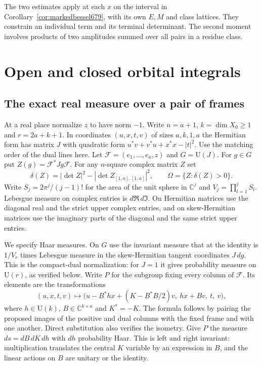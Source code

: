 \documentclass[a4paper,11pt]{article}
\theoremstyle{definition}
\theoremstyle{remark}
\numberwithin{equation}{section}
\begin{document}
The two estimates apply at each \(x\) on the interval in
Corollary~\ref{cor:markedbessel679}, with its own \(E,M\) and
class lattices. They constrain an individual term and its
terminal determinant. The second moment involves products of
two amplitudes summed over all pairs in a residue class.

\section{Open and closed orbital integrals}\label{nav:marked-open-closed}

\subsection{The exact real measure over a pair of frames}
\label{sec:realgram682}

At a real place normalize \(z\) to have norm \(-1\).
Write \(n=a+1\), \(k=\dim X_0\ge1\) and \(r=2a+k+1\).
In coordinates \((u,x,t,v)\) of sizes \(a,k,1,a\) the Hermitian
form has matrix \(J\) with quadratic form
\(u^*v+v^*u+x^*x-|t|^2\). Use the matching order of the dual
lines here. Let \(\mathcal F=(e_1,\ldots,e_a,z)\) and \(G=\mathrm U(J)\).
For \(g\in G\) put \(Z(g)=\mathcal F^*Jg\mathcal F\). For any
\(n\)-square complex matrix \(Z\) set
\[
 \delta(Z)=|\det Z|^2-|\det Z_{[1,a],[1,a]}|^2,\qquad
 \Omega=\{Z:\delta(Z)>0\}.
\]
Write \(S_j=2\pi^j/(j-1)!\) for the area of the unit sphere in
\(\mathbb C^j\) and \(V_j=\prod_{l=1}^j S_l\).
Lebesgue measure on complex entries is \(d\Re\,d\Im\). On
Hermitian matrices use the diagonal real and the strict upper
complex entries, and on skew-Hermitian matrices use the imaginary
parts of the diagonal and the same strict upper entries.

We specify Haar measures. On \(G\) use the invariant measure
that at the identity is \(1/V_r\) times Lebesgue measure in the
skew-Hermitian tangent coordinates \(J\,dg\). This is the
compact-dual normalization: for \(J=1\) it gives probability
measure on \(\mathrm U(r)\), as verified below. Write \(P\)
for the subgroup fixing every column of \(\mathcal F\). Its
elements are the transformations
\[
 (u,x,t,v)\longmapsto
 \big(u-B^*h x+(K-B^*B/2)v,\ h x+Bv,\ t,\ v\big),
\]
where \(h\in\mathrm U(k)\), \(B\in\mathbb C^{k\times a}\) and
\(K^*=-K\). The formula follows by pairing the proposed images
of the positive and dual columns with the fixed frame and with
one another. Direct substitution also verifies the isometry.
Give \(P\) the measure \(ds=dB\,dK\,dh\) with \(dh\) probability
Haar. This is left and right invariant: multiplication translates
the central \(K\) variable by an expression in \(B\), and the
linear actions on \(B\) are unitary or the identity.
\end{document}
